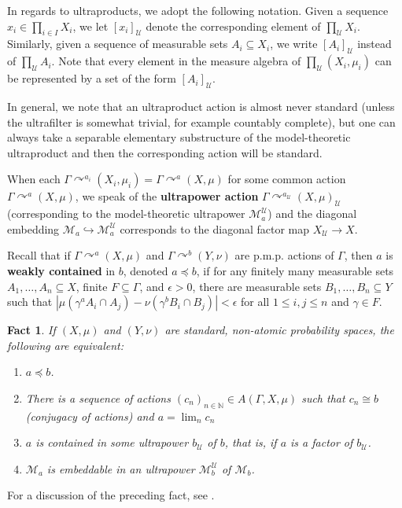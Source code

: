\documentclass[12pt]{amsart}
\newtheorem{fact}[thm]{Fact}
\theoremstyle{definition}
\def\bb{\mathbb}
\def\bb{\mathbb}
\def\cal{\mathcal}
\def\u{\mathsf 1}
\def \u{\mathcal U}
\newcommand{\pmp}{p{$.$}m{$.$}p{$.$}}
\newcommand{\acts}{\curvearrowright}
\begin{document}
In regards to ultraproducts, we adopt the following notation.  Given a sequence $x_i \in \prod_{i\in I}X_i$, we let $[x_i]_\u$ denote the corresponding element of $\prod_\u X_i$.  Similarly, given a sequence of measurable sets $A_i\subseteq X_i$, we write $[A_i]_\u$ instead of $\prod_\u A_i$. Note that every element in the measure algebra of $\prod_\u (X_i,\mu _i)$ can be represented by a set of the form $[A_i]_\u$.

In general, we note that an ultraproduct action is almost never standard (unless the ultrafilter is somewhat trivial, for example countably complete), but one can always take a separable elementary substructure of the model-theoretic ultraproduct and then the corresponding action will be standard.

When each $\Gamma\acts^{a_i}(X_i,\mu_i)=\Gamma\acts^a(X,\mu)$ for some common action $\Gamma\acts ^a(X,\mu)$, we speak of the \textbf{ultrapower action} $\Gamma\acts^{a_\u}(X,\mu)_\u$ (corresponding to the model-theoretic ultrapower $\cal M_a^\u$) and the diagonal embedding $\cal M_a\hookrightarrow \cal M_a^\u$ corresponds to the diagonal factor map $X_\u\to X$.

Recall that if $\Gamma\acts^a (X,\mu)$ and $\Gamma\acts^b (Y,\nu)$ are {\pmp} actions of $\Gamma$, then $a$ is \textbf{weakly contained} in $b$, denoted $a\preceq b$, if for any finitely many measurable sets $A_1,\ldots,A_n\subseteq X$, finite $F\subseteq \Gamma$, and $\epsilon>0$, there are measurable sets $B_1,\ldots,B_n\subseteq Y$ such that $|\mu(\gamma^aA_i\cap A_j)-\nu(\gamma^bB_i\cap B_j)|<\epsilon$ for all $1\leq i,j\leq n$ and $\gamma\in F$.

\begin{fact}
If $(X,\mu)$ and $(Y,\nu)$ are standard, non-atomic probability spaces, the following are equivalent:
\begin{enumerate}
    \item $a\preceq b$.
    \item There is a sequence of actions $(c_n)_{n\in \bb N}\in A(\Gamma,X,\mu)$ such that $c_n\cong b$ (conjugacy of actions) and $a=\lim_n c_n$
    \item $a$ is contained in some ultrapower $b_\u$ of $b$, that is, if $a$ is a factor of $b_\u$.
    \item $\cal M_a$ is embeddable in an ultrapower $\cal M_b^\u$ of $\cal M_b$.
\end{enumerate}
\end{fact}

For a discussion of the preceding fact, see \cite[Subection 2.2]{kechrisburton}.
\end{document}
